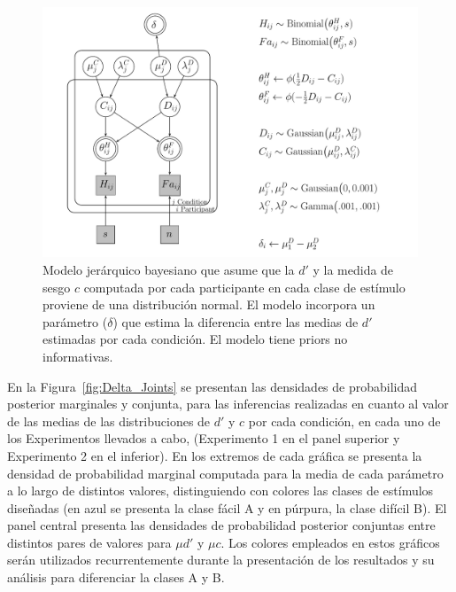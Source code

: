 \begin{figure}[th]
\centering
\includegraphics[width=1.1\textwidth]{Figures/Model_Delta_Diff_D}
\caption[Modelo Delta: Modelo jerárquico bayesiano para revisar las diferencias en $d'$ entre clases de estímulos]{Modelo jerárquico bayesiano que asume que la $d'$ y la medida de sesgo $c$ computada por cada participante en cada clase de estímulo proviene de una distribución normal. El modelo incorpora un parámetro ($\delta$) que estima la diferencia entre las medias de $d'$ estimadas por cada condición. El modelo tiene priors no informativas.}
\label{fig:Mod_Delta}
\end{figure}

En la Figura~\ref{fig:Delta_Joints} se presentan las densidades de probabilidad posterior marginales y conjunta, para las inferencias realizadas en cuanto al valor de las medias de las distribuciones de $d'$ y $c$ por cada condición, en cada uno de los Experimentos llevados a cabo, (Experimento 1 en el panel superior y Experimento 2 en el inferior). En los extremos de cada gráfica se presenta la densidad de probabilidad marginal computada para la media de cada parámetro a lo largo de distintos valores, distinguiendo con colores las clases de estímulos diseñadas (en azul se presenta la clase fácil A y en púrpura, la clase difícil B). El panel central presenta las densidades de probabilidad posterior conjuntas entre distintos pares de valores para $\mu d'$ y $\mu c$. Los colores empleados en estos gráficos serán utilizados recurrentemente durante la presentación de los resultados y su análisis para diferenciar la clases A y B.\\ 

